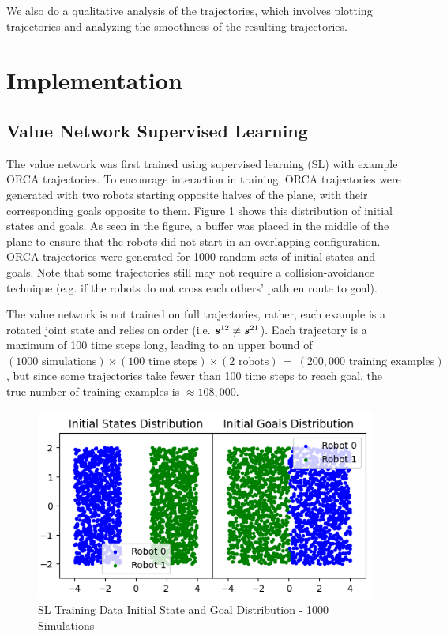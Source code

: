 \documentclass[conference]{IEEEtran}
\begin{document}
We also do a qualitative analysis of the trajectories, which involves plotting trajectories and analyzing the smoothness of the resulting trajectories.
\section{Implementation}

\subsection{Value Network Supervised Learning}
The value network was first trained using supervised learning (SL) with example ORCA trajectories. To encourage interaction in training, ORCA trajectories were generated with two robots starting opposite halves of the plane, with their corresponding goals opposite to them. Figure \ref{fig:training_init} shows this distribution of initial states and goals. As seen in the figure, a buffer was placed in the middle of the plane to ensure that the robots did not start in an overlapping configuration. ORCA trajectories were generated for 1000 random sets of initial states and goals. Note that some trajectories still may not require a collision-avoidance technique (e.g. if the robots do not cross each others' path en route to goal).

The value network is not trained on full trajectories, rather, each example is a rotated joint state and relies on order (i.e. $\boldsymbol{s}^{12}_{}\neq\boldsymbol{s}^{21}_{}$). Each trajectory is a maximum of 100 time steps long, leading to an upper bound of $(1000 \text{ simulations})\times(100\text{ time steps})\times(2 \text{ robots}) \, = \ (200,000 \text{ training examples})$, but since some trajectories take fewer than 100 time steps to reach goal, the true number of training examples is $\approx108,000$.

\begin{figure}[h!]
    \centering
    \includegraphics[width=0.9\linewidth]{docs/latex/figures/training_data_distribution.png}
    \caption{SL Training Data Initial State and Goal Distribution - 1000 Simulations}
    \label{fig:training_init}
\end{figure}
\end{document}
